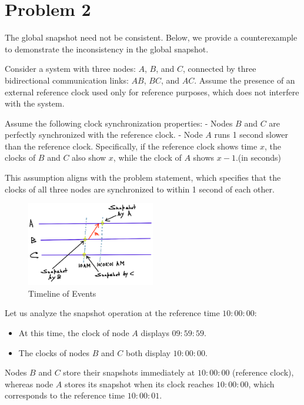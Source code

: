 \section{Problem 2}\label{prob2}

The global snapshot need not be consistent. Below, we provide a counterexample to demonstrate the inconsistency in the global snapshot.

Consider a system with three nodes: \(A\), \(B\), and \(C\), connected by three bidirectional communication links: \(AB\), \(BC\), and \(AC\). Assume the presence of an external reference clock used only for reference purposes, which does not interfere with the system.

Assume the following clock synchronization properties:
- Nodes \(B\) and \(C\) are perfectly synchronized with the reference clock.
- Node \(A\) runs 1 second slower than the reference clock. Specifically, if the reference clock shows time \(x\), the clocks of \(B\) and \(C\) also show \(x\), while the clock of \(A\) shows \(x - 1\).(in seconds)

This assumption aligns with the problem statement, which specifies that the clocks of all three nodes are synchronized to within 1 second of each other.

\begin{figure}[h]
    \centering
    \includegraphics[width=0.5\textwidth]{IMG/Q2.jpeg}
    \caption{Timeline of Events}
    \label{fig:timeline}
\end{figure}

Let us analyze the snapshot operation at the reference time \(10{:}00{:}00\):  
\begin{itemize}
    \item At this time, the clock of node \(A\) displays \(09{:}59{:}59\).  
    \item The clocks of nodes \(B\) and \(C\) both display \(10{:}00{:}00\).  
\end{itemize}

Nodes \(B\) and \(C\) store their snapshots immediately at \(10{:}00{:}00\) (reference clock), whereas node \(A\) stores its snapshot when its clock reaches \(10{:}00{:}00\), which corresponds to the reference time \(10{:}00{:}01\).

